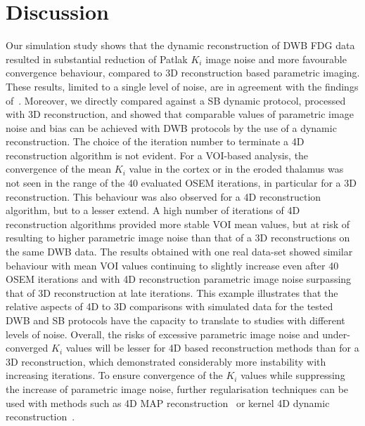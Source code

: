 \section*{Discussion}
Our simulation study shows that the dynamic reconstruction of DWB FDG data resulted in substantial reduction of Patlak $K_i$ image noise and more favourable convergence behaviour, compared to 3D reconstruction based parametric imaging. These results, limited to a single level of noise, are in agreement with the findings of~\cite{Karakatsanis2016a}. 
Moreover, we directly compared against a SB dynamic protocol, processed with 3D reconstruction, and showed that comparable values of parametric image noise and bias can be achieved with DWB protocols by the use of a dynamic reconstruction.
The choice of the iteration number to terminate a 4D reconstruction algorithm is not evident.
For a VOI-based analysis, the convergence of the mean $K_i$ value in the cortex or in the eroded thalamus was not seen in the range of the 40 evaluated OSEM iterations, in particular for a 3D reconstruction. This behaviour was also observed for a 4D reconstruction algorithm, but to a lesser extend. A high number of iterations of 4D reconstruction algorithms provided more stable VOI mean values, but at risk of resulting to higher parametric image noise than that of a 3D reconstructions on the same DWB data. 
The results obtained with one real data-set showed similar behaviour with mean VOI values continuing to slightly increase even after 40 OSEM iterations and with 4D reconstruction parametric image noise surpassing that of 3D reconstruction at late iterations.
This example illustrates that the relative aspects of 4D to 3D comparisons with simulated data for the tested DWB and SB protocols have the capacity to translate to studies with different levels of noise. %
Overall, the risks of excessive parametric image noise and under-converged $K_i$ values will be lesser for 4D based reconstruction methods than for a 3D reconstruction, which demonstrated considerably more instability with increasing iterations. To ensure convergence of the $K_i$ values while suppressing the increase of parametric image noise, further regularisation techniques can be used with methods such as 4D MAP reconstruction~\cite{Reader2014,Wang2008} or kernel 4D dynamic reconstruction~\cite{Novosad2016b,Gong2018}.

